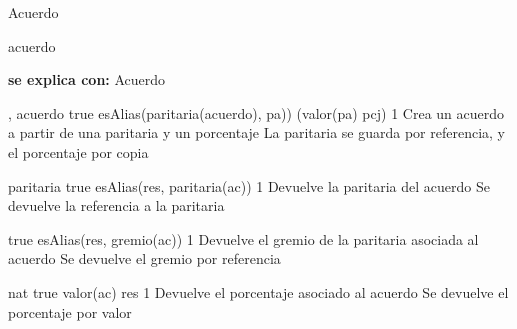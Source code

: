 \begin{interfaz}{Acuerdo}

\begin{iparamformales}{acuerdo}

\textbf{\large se explica con:} Acuerdo

\end{iparamformales}

{, }{acuerdo}
{true}
{esAlias(paritaria(acuerdo), pa)) \land (valor(pa) \igobs pcj)}
{1}
{Crea un acuerdo a partir de una paritaria y un porcentaje}
{La paritaria se guarda por referencia, y el porcentaje por copia}

{}{paritaria}
{true}
{esAlias(res, paritaria(ac))}
{1}
{Devuelve la paritaria del acuerdo}
{Se devuelve la referencia a la paritaria}

{true}
{esAlias(res, gremio(ac))}
{1}
{Devuelve el gremio de la paritaria asociada al acuerdo}
{Se devuelve el gremio por referencia}

{}{nat}
{true}
{valor(ac) \igobs res}
{1}
{Devuelve el porcentaje asociado al acuerdo}
{Se devuelve el porcentaje por valor}

\end{interfaz}